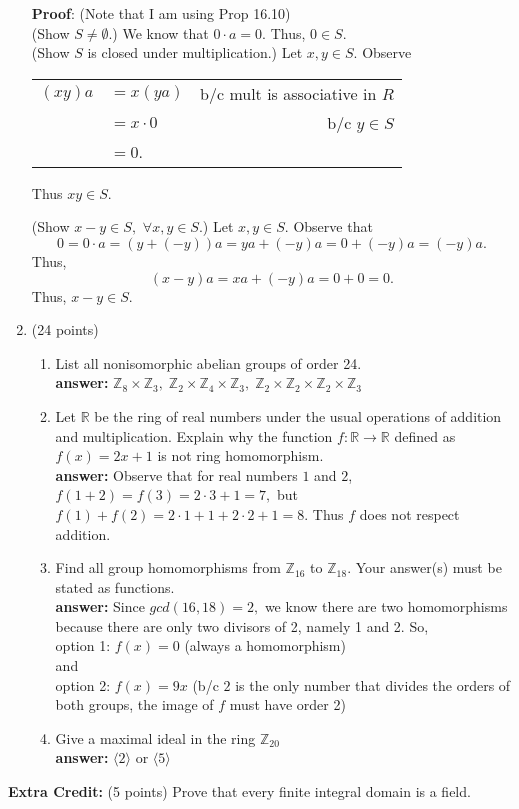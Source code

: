 \documentclass[12pt]{article}
\renewcommand{\emph}[1]{\textsf{\textbf{#1}}}
\newcommand{\bbZ}{\mathbb{Z}}
\begin{document}
\begin{enumerate}
\textbf{Proof}: (Note that I am using Prop 16.10)\\
(Show $S \not = \emptyset$.) We know that $0 \cdot a =0.$ Thus, $0 \in S.$\\
(Show $S$ is closed under multiplication.) Let $x,y \in S.$ Observe\\
\begin{center}
\begin{tabular}{rlr}
$(xy)a$&$=x(ya)$&b/c mult is associative in $R$\\
&$=x\cdot 0$& b/c $y \in S$\\
&$=0$.&\\
\end{tabular} 
\end{center}
Thus $xy \in S.$

(Show $x-y \in S,$ $\forall x,y \in S.$) Let $x,y \in S.$ Observe that 
$$0=0\cdot a = (y+(-y))a=ya+(-y)a=0+(-y)a=(-y)a.$$
Thus, 
$$(x-y)a=xa+(-y)a=0+0=0.$$
Thus, $x-y \in S.$

\vfill

\item (24 points) 
\begin{enumerate}
	\item List all nonisomorphic abelian groups of order 24.\\
	
	\textbf{answer:} $\bbZ_8 \times \bbZ_3,\; \bbZ_2 \times\bbZ_4 \times \bbZ_3,\; \bbZ_2 \times\bbZ_2 \times\bbZ_2 \times \bbZ_3$
	\vfill
	\item Let $\mathbb{R}$ be the ring of real numbers under the usual operations of addition and multiplication. Explain why the function $f:\mathbb{R} \to \mathbb{R}$ defined as $f(x)=2x+1$ is not ring homomorphism.\\
	
	\textbf{answer:} Observe that for real numbers $1$ and $2$, $f(1+2)=f(3)=2\cdot 3+1=7,$ but $f(1)+f(2)=2\cdot 1+1+2\cdot 2+1=8.$ Thus $f$ does not respect addition.\\
	\vfill
	\item Find all group homomorphisms from $\mathbb{Z}_{16}$ to $\mathbb{Z}_{18}.$ Your answer(s) must be stated as functions.\\
	
	\textbf{answer:}  Since $gcd(16,18)=2,$ we know there are two homomorphisms because there are only two divisors of 2, namely 1 and 2.  So,\\
	option 1: $f(x)=0$ (always a homomorphism)\\
	and\\
	option 2: $f(x)=9x$ (b/c $2$ is the only number that divides the orders of both groups, the image of $f$ must have order 2)\\
	\vfill
	\item Give a maximal ideal in the ring $\mathbb{Z}_{20}$\\
	\textbf{answer:} $\langle 2 \rangle$ or $\langle 5 \rangle$ 
	
	\vfill
\end{enumerate}
\end{enumerate}
\emph{Extra Credit:} (5 points) Prove that every finite integral domain is a field.\\
\end{document}
